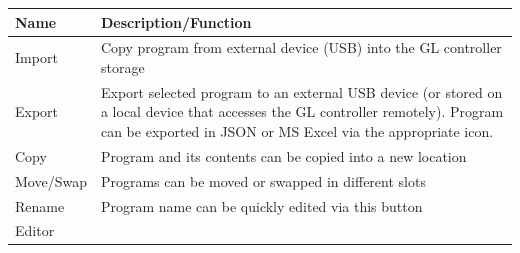 \begin{longtable}[]{@{}ll@{}}
\toprule
\begin{minipage}[b]{0.20\columnwidth}\raggedright
Name\strut
\end{minipage} & \begin{minipage}[b]{0.74\columnwidth}\raggedright
Description/Function\strut
\end{minipage}\tabularnewline
\midrule
\endhead
\begin{minipage}[t]{0.20\columnwidth}\raggedright
Import\strut
\end{minipage} & \begin{minipage}[t]{0.74\columnwidth}\raggedright
Copy program from external device (USB) into the GL controller
storage\strut
\end{minipage}\tabularnewline
\begin{minipage}[t]{0.20\columnwidth}\raggedright
Export\strut
\end{minipage} & \begin{minipage}[t]{0.74\columnwidth}\raggedright
Export selected program to an external USB device (or stored on a local
device that accesses the GL controller remotely). Program can be
exported in JSON or MS Excel via the appropriate icon.\strut
\end{minipage}\tabularnewline
\begin{minipage}[t]{0.20\columnwidth}\raggedright
Copy\strut
\end{minipage} & \begin{minipage}[t]{0.74\columnwidth}\raggedright
Program and its contents can be copied into a new location\strut
\end{minipage}\tabularnewline
\begin{minipage}[t]{0.20\columnwidth}\raggedright
Move/Swap\strut
\end{minipage} & \begin{minipage}[t]{0.74\columnwidth}\raggedright
Programs can be moved or swapped in different slots\strut
\end{minipage}\tabularnewline
\begin{minipage}[t]{0.20\columnwidth}\raggedright
Rename\strut
\end{minipage} & \begin{minipage}[t]{0.74\columnwidth}\raggedright
Program name can be quickly edited via this button\strut
\end{minipage}\tabularnewline
\begin{minipage}[t]{0.20\columnwidth}\raggedright
Editor\strut

\end{minipage}
\end{longtable}
